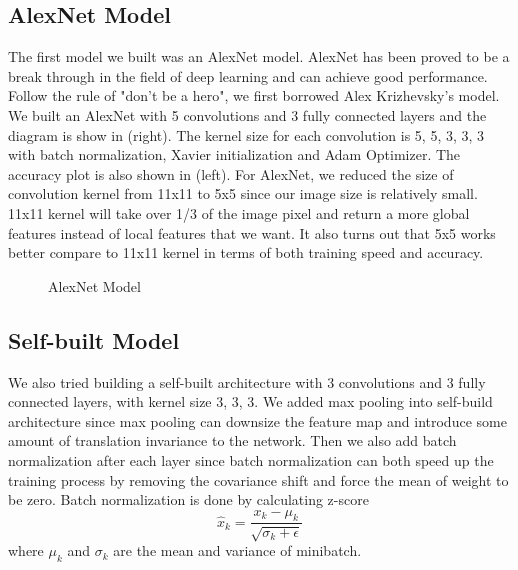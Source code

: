 \documentclass{article} %
\begin{document}
\subsection{AlexNet Model}
The first model we built was an AlexNet model. AlexNet has been proved to be a break through in the
field of deep learning and can achieve good performance. Follow the rule of "don't be a hero", we
first borrowed Alex Krizhevsky's model. We built an AlexNet with 5 convolutions and 3 fully connected
 layers and the diagram is show in  (right). The kernel size for each convolution 
 is 5, 5, 3, 3, 3 with batch normalization, Xavier initialization and Adam Optimizer. The accuracy 
 plot is also shown in  (left). For AlexNet, we reduced the size of convolution kernel 
 from 11x11 to 5x5 since our image size is relatively small. 11x11 kernel will take over 1/3 of the 
 image pixel and return a more global features instead of local features that we want. It also turns 
 out that 5x5 works better compare to 11x11 kernel in terms of both training speed and accuracy.

\begin{figure}[h]
    \centering
    \qquad
    \caption{AlexNet Model}
    \label{fig:alex}
\end{figure}
 
 \subsection{Self-built Model}
 We also tried building a self-built architecture with 3 convolutions and 3 fully connected layers, 
 with kernel size 3, 3, 3. We added max pooling into self-build architecture since max pooling can 
 downsize the feature map and introduce some amount of translation invariance to the network. 
 Then we also add batch normalization after each layer since batch normalization can both speed up
 the training process by removing the covariance shift and force the mean of weight to be zero.
 Batch normalization is done by calculating z-score 
 \begin{equation}
     \hat{x}_k = \frac{x_k-\mu_k}{\sqrt{\sigma_k+\epsilon}}
 \end{equation} where $\mu_k$ and $\sigma_k$ are the mean and variance of minibatch.\
 
\end{document}
